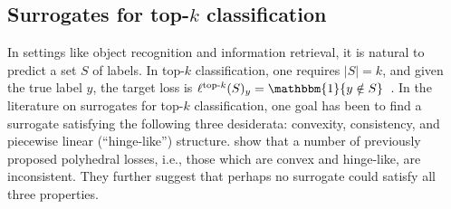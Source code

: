 \documentclass[11pt]{article}
\newcommand{\Comments}{1}
\newcommand{\mynote}[2]{\ifnum\Comments=1\textcolor{#1}{#2}\fi}
\newcommand{\mytodo}[2]{\ifnum\Comments=1%
  \todo[linecolor=#1!80!black,backgroundcolor=#1,bordercolor=#1!80!black]{#2}\fi}
\newcommand{\raft}[1]{\mytodo{green!20!white}{RF: #1}}
\newcommand{\jessie}[1]{\mynote{teal}{[JF: #1]}}
\newcommand{\jessiet}[1]{\mytodo{teal!20!white}{JF: #1}}
\newcommand{\simplex}{\Delta_\Y}
\newcommand{\Y}{\mathcal{Y}}
\newcommand{\ones}{\mathbbm{1}}
\newcommand{\elltopk}{\ell^{\text{top-$k$}}}
\begin{document}
\subsection{Surrogates for top-$k$ classification}
\label{sec:top-k}
In settings like object recognition and information retrieval, it is natural to predict a set $S$ of labels.
In top-$k$ classification, one requires $|S|=k$, and given the true label $y$, the target loss is $\elltopk(S)_y = \ones\{y\notin S\}$~\citep{lapin2015top, lapin2016loss, lapin2018analysis,yang2018consistency,berrada2018smooth,rastegari2011scalable,reddi2019stochastic}.
In the literature on surrogates for top-$k$ classification, one goal has been to find a surrogate satisfying the following three desiderata: convexity, consistency, and piecewise linear (``hinge-like'') structure.
\citet{yang2018consistency} show that a number of previously proposed polyhedral losses, i.e., those which are convex and hinge-like, are inconsistent.
They further suggest that perhaps no surrogate could satisfy all three properties.
\end{document}
